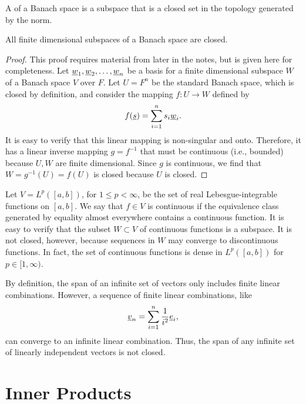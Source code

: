 \begin{definition}
A  of a Banach space is a subspace that is a closed set in the topology generated by the norm.
\end{definition}

\begin{theorem}
All finite dimensional subspaces of a Banach space are closed.
\end{theorem}
\begin{proof}
This proof requires material from later in the notes, but is given here for completeness.
Let $\underline{w}_1,\underline{w}_2,\ldots,\underline{w}_n$ be a basis for a finite dimensional subspace $W$ of a Banach space $V$ over $F$.
Let $U = F^n$ be the standard Banach space, which is closed by definition, and consider the mapping $f \colon U\rightarrow W$ defined by
\[ f(\underline{s}) = \sum_{i=1}^n s_i \underline{w}_i. \]
It is easy to verify that this linear mapping is non-singular and onto.
Therefore, it has a linear inverse mapping $g = f^{-1}$ that must be continuous (i.e., bounded) because $U,W$ are finite dimensional.
Since $g$ is continuous, we find that $W = g^{-1}(U) = f(U)$ is closed because $U$ is closed.
\end{proof}

\begin{example}
Let $V = L^p ( [a,b] )$, for $1\leq p <\infty$, be the set of real Lebesgue-integrable functions on $[a,b]$.
We say that $f \in V$ is continuous if the equivalence class generated by equality almost everywhere contains a continuous function.
It is easy to verify that the subset $W \subset V$ of continuous functions is a subspace.
It is not closed, however, because sequences in $W$ may converge to discontinuous functions.
In fact,  the set of continuous functions is dense in $L^p ([a,b])$ for $p\in[1,\infty)$. %
\end{example}
\begin{example}
By definition, the span of an infinite set of vectors only includes finite linear combinations.
However, a sequence of finite linear combinations, like 
\[ \underline{v}_n = \sum_{i=1}^n \frac{1}{i^2} \underline{e}_i, \]  can converge to an infinite linear combination.
Thus, the span of any infinite set of linearly independent vectors is not closed.
\end{example}


\section{Inner Products}

